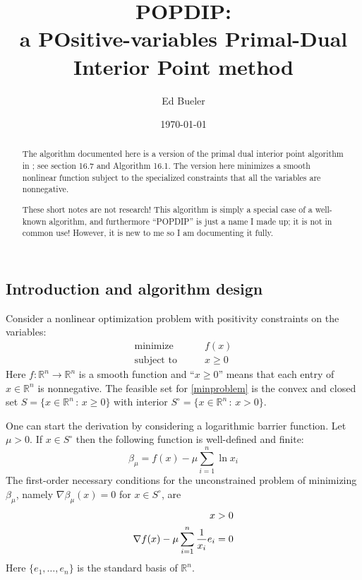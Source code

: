 \documentclass[11pt]{article}
\title{POPDIP: \\ a POsitive-variables Primal-Dual Interior Point method}
\author{Ed Bueler}
\date{\today}
\newcommand{\RR}{\mathbb{R}}
\newcommand{\grad}{\nabla}
\begin{document}
\maketitle

\begin{abstract}
The algorithm documented here is a version of the primal dual interior point algorithm in \cite{GrivaNashSofer2009}; see section 16.7 and Algorithm 16.1.  The version here minimizes a smooth nonlinear function subject to the specialized constraints that all the variables are nonnegative.

These short notes are not research!  This algorithm is simply a special case of a well-known algorithm, and furthermore ``POPDIP'' is just a name I made up; it is not in common use!  However, it is new to me so I am documenting it fully.
\end{abstract}

\thispagestyle{empty}

\bigskip
\subsection*{Introduction and algorithm design}

Consider a nonlinear optimization problem with positivity constraints on the variables:
\begin{equation}
\begin{matrix}
\text{minimize} \qquad & f(x) \\
\text{subject to} \qquad & x \ge 0
\end{matrix} \label{minproblem}
\end{equation}
Here $f:\RR^n\to\RR^n$ is a smooth function and ``$x\ge 0$'' means that each entry of $x\in\RR^n$ is nonnegative.  The feasible set for \eqref{minproblem} is the convex and closed set $S = \{x\in \RR^n\,:\,x\ge 0\}$ with interior $S^\circ = \{x\in \RR^n\,:\,x > 0\}$.

One can start the derivation by considering a logarithmic barrier function.  Let $\mu>0$.  If $x\in S^\circ$ then the following function is well-defined and finite:
\begin{equation}
\beta_\mu = f(x) - \mu \sum_{i=1}^n \ln x_i \label{barrierfunction}
\end{equation}
The first-order necessary conditions for the unconstrained problem of minimizing $\beta_\mu$, namely $\grad \beta_\mu(x)=0$ for $x \in S^\circ$, are
\begin{align}
x &> 0 \label{firstorderbarrier} \\
\grad f(x) - \mu \sum_{i=1}^n \frac{1}{x_i} e_i &= 0 \notag
\end{align}
Here $\{e_1,\dots,e_n\}$ is the standard basis of $\RR^n$.
\end{document}
